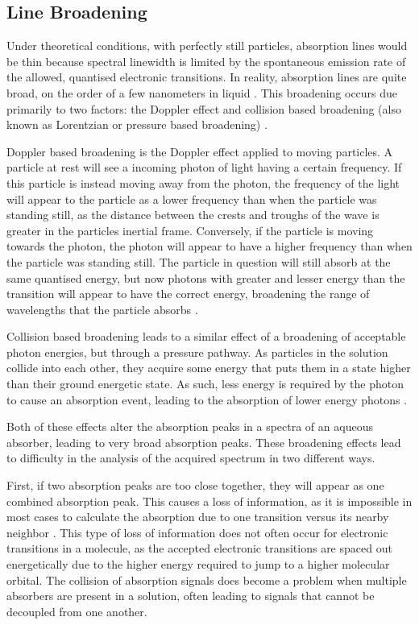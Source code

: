 \subsection{Line Broadening}\label{subsec:line_broad}

Under theoretical conditions, with perfectly still particles, absorption
lines would be thin because spectral linewidth is limited by the spontaneous
emission rate of the allowed, quantised electronic transitions. In reality,
absorption lines are quite broad, on the order of a few nanometers in liquid
\cite{Hollas:2004uh}. This broadening occurs due primarily to two factors: the
Doppler effect and collision based broadening (also known as Lorentzian or
pressure based broadening) \cite{Olivero:1977ul}.

Doppler based broadening is the Doppler effect applied to moving particles.
A particle at rest will see a incoming photon of light having a certain
frequency. If this particle is instead moving away from the photon, the
frequency of the light will appear to the particle as a lower frequency than
when the particle was standing still, as the distance between the crests and
troughs of the wave is greater in the particles inertial frame. Conversely,
if the particle is moving towards the photon, the photon will appear to have
a higher frequency than when the particle was standing still. The particle
in question will still absorb at the same quantised energy, but now photons
with greater and lesser energy than the transition will appear to have the
correct energy, broadening the range of wavelengths that the particle absorbs
\cite{Fox:2006uy}.

Collision based broadening leads to a similar effect of a broadening of
acceptable photon energies, but through a pressure pathway. As particles in
the solution collide into each other, they acquire some energy that puts them
in a state higher than their ground energetic state. As such, less energy is
required by the photon to cause an absorption event, leading to the absorption
of lower energy photons \cite{Ngo:2012jk}.

Both of these effects alter the absorption peaks in a spectra of an
aqueous absorber, leading to very broad absorption peaks. These broadening
effects lead to difficulty in the analysis of the acquired spectrum in two
different ways.

First, if two absorption peaks are too close together, they will appear as
one combined absorption peak. This causes a loss of information, as it is
impossible in most cases to calculate the absorption due to one transition
versus its nearby neighbor \cite{Fowles:1975wg}. This type of loss of
information does not often occur for electronic transitions in a molecule, as
the accepted electronic transitions are spaced out energetically due to the
higher energy required to jump to a higher molecular orbital. The collision of
absorption signals does become a problem when multiple absorbers are present
in a solution, often leading to signals that cannot be decoupled from one
another.

